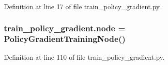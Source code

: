 Definition at line 17 of file train\+\_\+policy\+\_\+gradient.\+py.

\subsubsection[{\texorpdfstring{node}{node}}]{\setlength{\rightskip}{0pt plus 5cm}train\+\_\+policy\+\_\+gradient.\+node = {\bf Policy\+Gradient\+Training\+Node}()}\hypertarget{namespacetrain__policy__gradient_a852a46833bbfa225d7d5c6ea8430957c}{}\label{namespacetrain__policy__gradient_a852a46833bbfa225d7d5c6ea8430957c}


Definition at line 110 of file train\+\_\+policy\+\_\+gradient.\+py.

